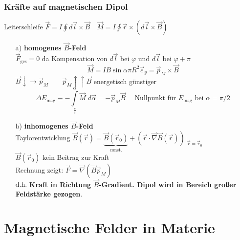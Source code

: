 \documentclass[titlepage,12pt,a4paper,ngerman]{report}
\newcommand{\tx}[1]{\textrm{#1}}
\newcommand{\ub}[1]{\underbrace{#1}}
\begin{document}
\subsubsection{Kräfte auf magnetischen Dipol}
Leiterschleife $ \vec{F} = I \oint d\vec{l} \times \vec{B} \quad \vec{M} = I \oint \vec{r} \times (d\vec{l} \times \vec{B}) $\\
\begin{itemize}
	\item[a)] \textbf{homogenes $ \vec{B} $-Feld}\\
	$ \vec{F}_{\tx{ges}} = 0 $ da Kompensation von $ d\vec{l} $ bei $ \varphi $ und $ d\vec{l} $ bei $ \varphi + \pi $\\
	$$ \vec{M} = I B \sin \alpha \pi R^2 \vec{e}_y = \vec{p}_M \times \vec{B} $$
	$ \vec{B} \downarrow \rightarrow \vec{p}_M \qquad \vec{p}_M \uparrow \uparrow \vec{B} $ energetisch günstiger\\\pagebreak
	$$ \Delta E_{\tx{mag}} \equiv - \int \limits _{\frac{\pi}{2}} ^{\alpha} \vec{M} \; d \vec{\alpha} = - \vec{p}_M \vec{B} \quad \tx{ Nullpunkt für } E_{\tx{mag}} \tx{ bei } \alpha = \pi / 2 $$
	\item[b)] \textbf{inhomogenes $ \vec{B} $-Feld}\\
	Taylorentwicklung $ \vec{B} (\vec{r}) = \ub{\vec{B} (\vec{r}_0 )}_{\tx{const.}} + (\vec{r} \cdot \vec{\nabla} \vec{B}( \vec{r} )) \mathop{\vert}_{\vec{r} = \vec{r}_0} $\\
	$ \vec{B} (\vec{r}_0) $ kein Beitrag zur Kraft\\
	Rechnung zeigt: $ \vec{F} = \vec{\nabla} ( \vec{B} \vec{p}_M) $\\
	d.h. \textbf{Kraft in Richtung $\vec{B}$-Gradient. Dipol wird in Bereich großer Feldstärke gezogen}.
\end{itemize}


\section{Magnetische Felder in Materie}
\end{document}
